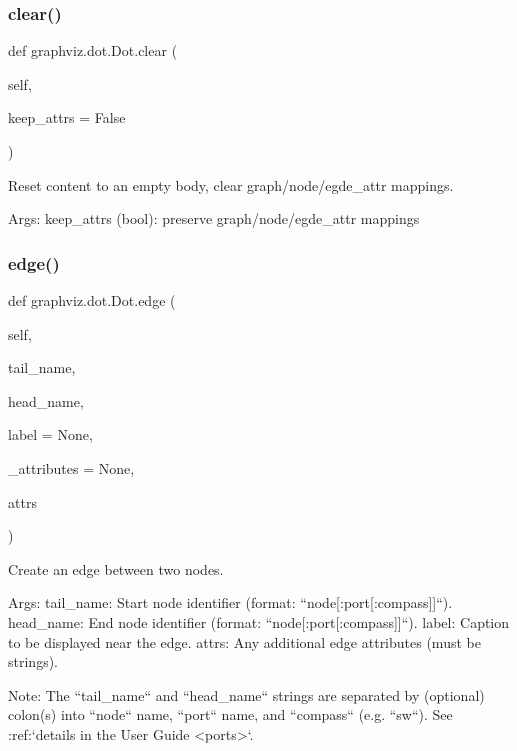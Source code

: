 \subsubsection{\texorpdfstring{clear()}{clear()}}
{\footnotesize\ttfamily def graphviz.\+dot.\+Dot.\+clear (\begin{DoxyParamCaption}\item[{}]{self,  }\item[{}]{keep\+\_\+attrs = {\ttfamily False} }\end{DoxyParamCaption})}

\begin{DoxyVerb}Reset content to an empty body, clear graph/node/egde_attr mappings.

Args:
    keep_attrs (bool): preserve graph/node/egde_attr mappings
\end{DoxyVerb}
 \mbox{\label{classgraphviz_1_1dot_1_1Dot_aef2b20ff62cdd7bd9d8d018ac74f5e8b}} 
\subsubsection{\texorpdfstring{edge()}{edge()}}
{\footnotesize\ttfamily def graphviz.\+dot.\+Dot.\+edge (\begin{DoxyParamCaption}\item[{}]{self,  }\item[{}]{tail\+\_\+name,  }\item[{}]{head\+\_\+name,  }\item[{}]{label = {\ttfamily None},  }\item[{}]{\+\_\+attributes = {\ttfamily None},  }\item[{}]{attrs }\end{DoxyParamCaption})}

\begin{DoxyVerb}Create an edge between two nodes.

Args:
    tail_name: Start node identifier (format: ``node[:port[:compass]]``).
    head_name: End node identifier (format: ``node[:port[:compass]]``).
    label: Caption to be displayed near the edge.
    attrs: Any additional edge attributes (must be strings).

Note:
    The ``tail_name`` and ``head_name`` strings are separated by
    (optional) colon(s) into ``node`` name, ``port`` name, and
    ``compass`` (e.g. ``sw``).
    See :ref:`details in the User Guide <ports>`.
\end{DoxyVerb}
 \mbox{\label{classgraphviz_1_1dot_1_1Dot_a644b305ee0699911022f442fd452b847}} 
